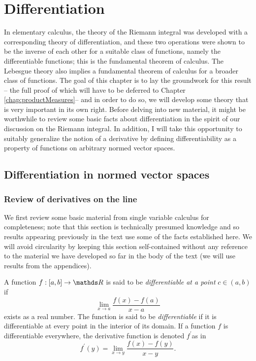 
\chapter{\label{chap:Differentiation}Differentiation}

In elementary calculus, the theory of the Riemann integral was developed
with a corresponding theory of differentiation, and these two operations
were shown to be the inverse of each other for a suitable class of
functions, namely the differentiable functions; this is the fundamental
theorem of calculus. The Lebesgue theory also implies a fundamental
theorem of calculus for a broader class of functions. The goal of
this chapter is to lay the groundwork for this result -- the full
proof of which will have to be deferred to Chapter \ref{chap:productMeasures}--
and in order to do so, we will develop some theory that is very important
in its own right. Before delving into new material, it might be worthwhile
to review some basic facts about differentiation in the spirit of
our discussion on the Riemann integral. In addition, I will take this
opportunity to suitably generalize the notion of a derivative by defining
differentiability as a property of functions on arbitrary normed vector
spaces.

\section{Differentiation in normed vector spaces}

\subsection{Review of derivatives on the line}

We first review some basic material from single variable calculus
for completeness; note that this section is technically presumed knowledge
and so results appearing previously in the text use some of the facts
established here. We will avoid circularity by keeping this section
self-contained without any reference to the material we have developed
so far in the body of the text (we will use results from the appendices).
\begin{defn}
\label{def:differentiable}A function $f:\left[a,b\right]\to\R$ is
said to be \emph{differentiable at a point }$c\in\left(a,b\right)$
if 
\[
\lim_{x\to a}\frac{f\left(x\right)-f\left(a\right)}{x-a}
\]
exists as a real number. The function is said to be \emph{differentiable
}if it is differentiable at every point in the interior of its domain.
If a function $f$ is differentiable everywhere, the derivative function
is denoted $f^{\prime}$as in 
\[
f^{\prime}\left(y\right)=\lim_{x\to y}\frac{f\left(x\right)-f\left(y\right)}{x-y}.
\]
\end{defn}

